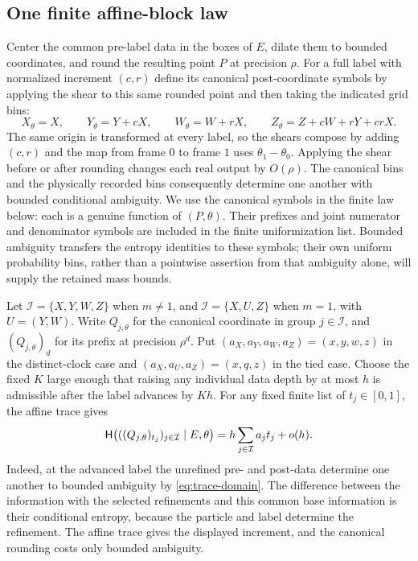 \subsection{One finite affine-block law}

Center the common pre-label data in the boxes of $E$, dilate them
to bounded coordinates, and round the resulting point $P$ at
precision $\rho$.  For a full label with normalized increment
$(c,r)$ define its canonical post-coordinate symbols by applying
the shear to this same rounded point and then taking the indicated
grid bins:
\begin{equation}
 X_\theta=X,\qquad Y_\theta=Y+cX,\qquad
 W_\theta=W+rX,\qquad
 Z_\theta=Z+cW+rY+crX.
 \label{eq:rate-shear}
\end{equation}
The same origin is transformed at every label, so the shears compose
by adding $(c,r)$ and the map from frame $0$ to frame $1$ uses
$\theta_1-\theta_0$.  Applying the shear before or after rounding
changes each real output by $O(\rho)$.  The canonical bins and the
physically recorded bins consequently determine one another with
bounded conditional ambiguity.  We use the canonical symbols in
the finite law below: each is a genuine function of $(P,\theta)$.
Their prefixes and joint numerator and denominator symbols are
included in the finite uniformization list.  Bounded ambiguity
transfers the entropy identities to these symbols; their own
uniform probability bins, rather than a pointwise assertion from
that ambiguity alone, will supply the retained mass bounds.

Let $\mathcal I=\{X,Y,W,Z\}$ when $m\ne1$, and
$\mathcal I=\{X,U,Z\}$ when $m=1$, with $U=(Y,W)$.
Write $Q_{j,\theta}$ for the canonical coordinate in group
$j\in\mathcal I$, and $(Q_{j,\theta})_d$ for its prefix at precision
$\rho^d$.  Put $(a_X,a_Y,a_W,a_Z)=(x,y,w,z)$ in the distinct-clock
case and $(a_X,a_U,a_Z)=(x,q,z)$ in the tied case.
Choose the fixed $K$ large enough that raising any
individual data depth by at most $h$ is admissible after the label
advances by $Kh$.  For any fixed finite list of $t_j\in[0,1]$, the
affine trace gives
\begin{equation}
 \mathsf H\bigl(((Q_{j,\theta})_{t_j})_{j\in\mathcal I}
          \mid E,\theta\bigr)
 =h\sum_{j\in\mathcal I} a_jt_j+o(h).
 \label{eq:rate-post-affine}
\end{equation}
Indeed, at the advanced label the unrefined pre- and post-data
determine one another to bounded ambiguity by
\eqref{eq:trace-domain}.  The difference between the information
with the selected refinements and this common base information is
their conditional entropy, because the particle and label determine
the refinement.  The affine trace gives the displayed increment,
and the canonical rounding costs only bounded ambiguity.

